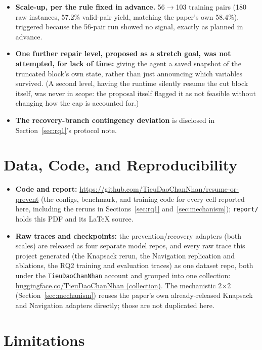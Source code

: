 \documentclass[11pt,a4paper]{article}
\begin{document}
\begin{itemize}
\item \textbf{Scale-up, per the rule fixed in advance.} 56$\to$103 training pairs (180 raw
  instances, 57.2\% valid-pair yield, matching the paper's own 58.4\%), triggered because the
  56-pair run showed no signal, exactly as planned in advance.
\item \textbf{One further repair level, proposed as a stretch goal, was not attempted, for lack
  of time:} giving the agent a saved snapshot of the truncated block's own state, rather than
  just announcing which variables survived. (A second level, having the runtime silently resume
  the cut block itself, was never in scope: the proposal itself flagged it as not feasible
  without changing how the cap is accounted for.)
\item \textbf{The recovery-branch contingency deviation} is disclosed in Section~\ref{sec:rq1}'s protocol
  note.
\end{itemize}

\section{Data, Code, and Reproducibility}
\label{sec:data}

\begin{itemize}
\item \textbf{Code and report:}
  \url{https://github.com/TieuDaoChanNhan/resume-or-prevent} (the configs, benchmark, and
  training code for every cell reported here, including the reruns in Sections~\ref{sec:rq1}
  and~\ref{sec:mechanism}); \texttt{report/} holds this PDF and its \LaTeX{} source.
\item \textbf{Raw traces and checkpoints:} the prevention/recovery adapters (both scales) are
  released as four separate model repos, and every raw trace this project generated (the
  Knapsack rerun, the Navigation replication and ablations, the RQ2 training and evaluation
  traces) as one dataset repo, both under the \texttt{TieuDaoChanNhan} account and grouped into
  one collection: \href{https://huggingface.co/collections/TieuDaoChanNhan/resume-or-prevent-gstar-2026-individual-project-6adf7ab692e0177bc1477d73}{huggingface.co/TieuDaoChanNhan (collection)}.
  The mechanistic 2$\times$2 (Section~\ref{sec:mechanism}) reuses the paper's own already-released
  Knapsack and Navigation adapters directly; those are not duplicated here.
\end{itemize}

\section{Limitations}
\label{sec:limitations}
\end{document}
